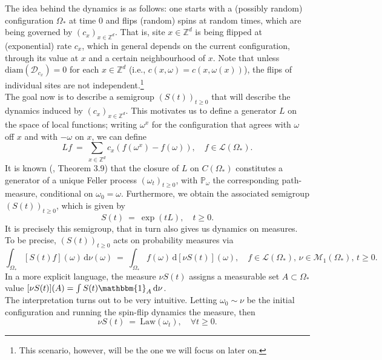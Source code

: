 \documentclass[12pt]{article}
\newcommand{\D}{\mathcal{D}}
\renewcommand{\d}{\mathrm{d}}
\newcommand{\Loc}{\mathcal{L}}
\newcommand{\M}{\mathcal{M}}
\renewcommand{\P}{\mathbb{P}}
\newcommand{\Z}{\mathbb{Z}}
\newcommand{\Law}{\mathrm{Law}}
\newcommand{\1}{\mathbbm{1}}
\newcommand{\5}{\vspace{0.5cm}}
\theoremstyle{definition}
\begin{document}
The idea behind the dynamics is as follows: one starts with a (possibly random) configuration $\Omega_*$ at time $0$ and flips (random) spins at random times, which are being governed by $(c_x)_{x\in\Z^d}$. That is, site $x\in\Z^d$ is being flipped at (exponential) rate $c_x$, which in general depends on the current configuration, through its value at $x$ and a certain neighbourhood of $x$. Note that unless $\mathrm{diam}(\D_{c_x})=0$ for each $x\in\Z^d$ (i.e., $c(x,\omega)=c(x,\omega(x))$), the flips of individual sites are not independent.\footnote{This scenario, however, will be the one we will focus on later on.} \\

The goal now is to describe a semigroup $(S(t))_{t\geq 0}$ that will describe the dynamics induced by $(c_x)_{x\in\Z^d}$. This motivates us to define a generator $L$ on the space of local functions; writing $\omega^x$ for the configuration that agrees with $\omega$ off $x$ and with $-\omega$ on $x$, we can define
$$Lf ~=~ \sum_{x\in\Z^d}c_x(f(\omega^x)-f(\omega)), \quad f\in\Loc(\Omega_*).$$ It is known (\cite{Lig}, Theorem 3.9) that the closure of $L$ on $C(\Omega_*)$ constitutes a generator of a unique Feller process $(\omega_t)_{t\geq 0}$, with $\P_\omega$ the corresponding path-measure, conditional on $\omega_0=\omega$. Furthermore, we obtain the associated semigroup $(S(t))_{t\geq 0}$, which is given by
$$S(t) ~=~ \exp(tL), \quad t\geq 0.$$
It is precisely this semigroup, that in turn also gives us dynamics on measures. To be precise, $(S(t))_{t\geq 0}$ acts on probability measures via	
$$\int_{\Omega_*} [S(t)f](\omega)\,\d\nu(\omega) ~=~ \int_{\Omega_*}f(\omega)\,\d[\nu S(t)](\omega), \quad f\in\Loc(\Omega_*),\,\nu\in\M_1(\Omega_*),\,t\geq 0.$$
In a more explicit language, the measure $\nu S(t)$ assigns a measurable set $A\subset\Omega_*$  value $[\nu S(t)](A)=\int S(t)\1_A\,\d\nu$. \\

The interpretation turns out to be very intuitive. Letting $\omega_0\sim\nu$ be the initial configuration and running the spin-flip dynamics the measure, then
$$\nu S(t) ~=~ \Law(\omega_t), \quad \forall t\geq 0.$$ 
\end{document}
